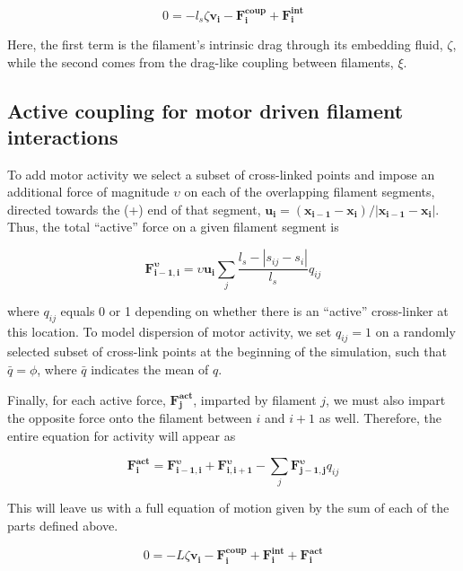 \documentclass[10pt,letterpaper]{article}
\begin{document}
\begin{equation}
\label{eqn:syst1}
0 = -l_s\zeta\mathbf{ v_i} -\mathbf{F^{coup}_i}+ \mathbf{F^{int}_i}
\end{equation}

Here, the first term is the filament's intrinsic drag through its embedding fluid, $\zeta$, while the second comes from the drag-like coupling between filaments, $\xi$.  

\subsection*{Active coupling for motor driven filament interactions}

To add motor activity we select a subset of cross-linked points and impose an additional force of magnitude $\upsilon$ on each of the overlapping filament segments, directed towards the (+) end of that segment, $\mathbf{u_i}=(\mathbf{x_{i-1}}-\mathbf{x_{i}})/|\mathbf{x_{i-1}}-\mathbf{x_{i}}|$. Thus, the total ``active'' force on a given filament segment is

\begin{equation}
\label{eqn:moto}
\mathbf{F^{\upsilon}_{i-1,i}}=\upsilon \mathbf{u_i}\sum_j \frac{l_s-|s_{ij}-s_i|}{l_s}q_{ij}
\end{equation}

where $q_{ij}$ equals 0 or 1 depending on whether there is an ``active'' cross-linker at this location. To model dispersion of motor activity, we set $q_{ij}=1$  on a randomly selected subset of cross-link points at the beginning of the simulation, such that $\bar{q}=\phi$, where $\bar{q}$ indicates the mean of $q$.  



Finally, for each active force, $\mathbf{F^{act}_j}$, imparted by filament $j$, we must also impart the opposite force onto the filament between $i$ and $i+1$ as well.  Therefore, the entire equation for activity will appear as

\begin{equation}
\label{eqn:active}
\mathbf{F^{act}_{i}}=\mathbf{F^{\upsilon}_{i-1,i}} + \mathbf{F^{\upsilon}_{i,i+1}}
- \sum_{j}\mathbf{F^{\upsilon}_{j-1,j}}q_{ij}
\end{equation}


This will leave us with a full equation of motion given by the sum of each of the parts defined above.

\begin{equation}
\label{eqn:syst3}
0=-L\zeta\mathbf{ v_i} -\mathbf{F^{coup}_i}+ \mathbf{F^{int}_i}+\mathbf{F^{act}_i} 
\end{equation}
\end{document}
